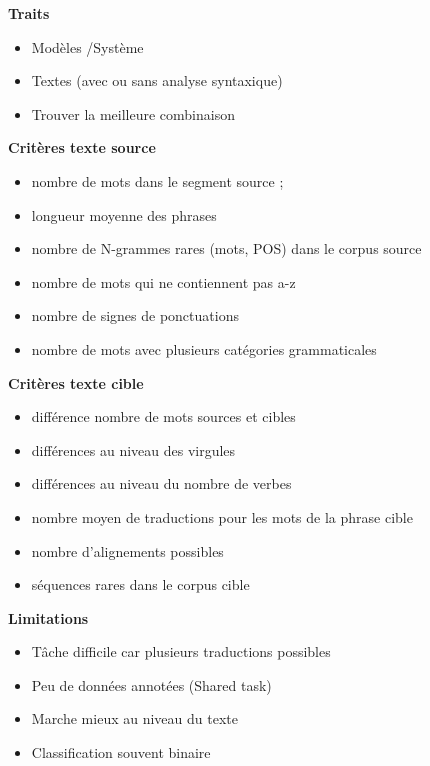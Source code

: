 \textbf{Traits}

\begin{itemize}
    \item Modèles /Système
    \item Textes (avec ou sans analyse syntaxique)
    \item Trouver la meilleure combinaison\\
\end{itemize}

\textbf{Critères texte source}

\begin{itemize}
    \item nombre de mots dans le segment source ;
    \item longueur moyenne des phrases
    \item nombre de N-grammes rares (mots, POS) dans le corpus source
    \item nombre de mots qui ne contiennent pas a-z
    \item nombre de signes de ponctuations
    \item nombre de mots avec plusieurs catégories grammaticales\\
\end{itemize}

\newpage

\textbf{Critères texte cible}

\begin{itemize}
    \item différence nombre de mots sources et cibles
    \item différences au niveau des virgules
    \item différences au niveau du nombre de verbes
    \item nombre moyen de traductions pour les mots de la phrase cible
    \item nombre d’alignements possibles
    \item séquences rares dans le corpus cible\\
\end{itemize}

\textbf{Limitations}

\begin{itemize}
    \item Tâche difficile car plusieurs traductions possibles
    \item Peu de données annotées (Shared task)
    \item Marche mieux au niveau du texte
    \item Classification souvent binaire
\end{itemize}

